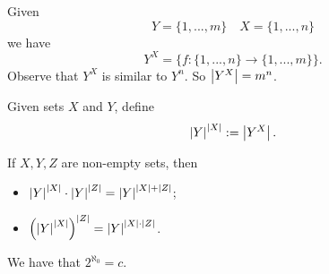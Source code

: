 \documentclass[notoc,notitlepage]{tufte-book}
\begin{document}
\begin{eg}
  Given
  \begin{equation*}
    Y = \{ 1, ..., m \} \quad X = \{ 1, ..., n \}
  \end{equation*}
  we have
  \begin{equation*}
    Y^X = \{ f : \{ 1, ..., n \} \to \{ 1, ..., m \} \}.
  \end{equation*}
  Observe that $Y^X$ is similar to $Y^n$. So $\left|Y^X\right| = m^n$.
\end{eg}

\begin{defn}
\label{defn:exponentiation_of_cardinals}
  Given sets $X$ and $Y$, define
  \begin{equation*}
    \left|Y\right|^{\left|X\right|} := \left|Y^X\right|.
  \end{equation*}
\end{defn}

\begin{thm}
\label{thm:exponentiation_of_cardinals}
  If $X, Y, Z$ are non-empty sets, then
  \begin{itemize}
    \item $\left|Y\right|^{\left|X\right|} \cdot \left|Y\right|^{\left|Z\right|} = \left|Y\right|^{\left|X\right| + \left|Z\right|}$;
    \item $\left( \left|Y\right|^{\left|X\right|} \right)^{\left|Z\right|} = \left|Y\right|^{\left|X\right| \cdot \left|Z\right|}$.
  \end{itemize}
\end{thm}

\begin{thm}[$2^{\aleph_0} = c$]
\label{thm:2_aleph_0_c}
We have that $2^{\aleph_0} = c$.
\end{thm}
\end{document}
